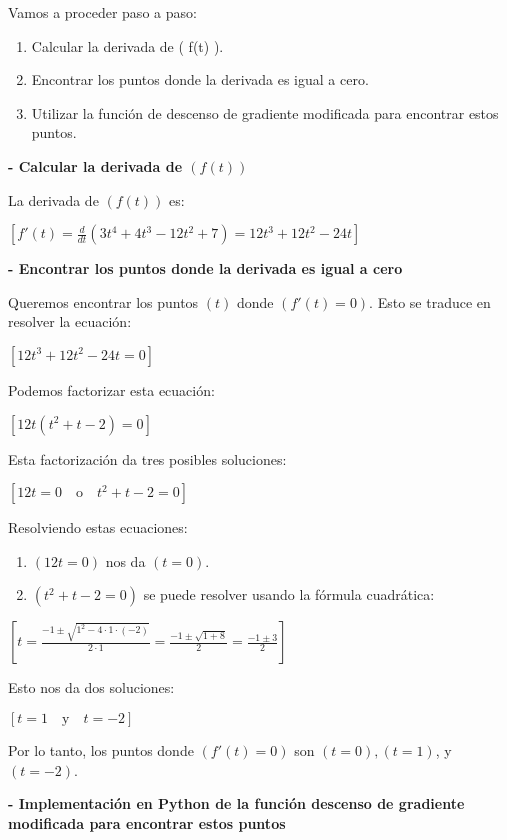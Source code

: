 \documentclass[11pt]{article}
\providecommand{\tightlist}{%
      \setlength{\itemsep}{0pt}\setlength{\parskip}{0pt}}
\begin{document}
Vamos a proceder paso a paso:

\begin{enumerate}
\def\labelenumi{\arabic{enumi}.}
\tightlist
\item
  Calcular la derivada de ( f(t) ).
\item
  Encontrar los puntos donde la derivada es igual a cero.
\item
  Utilizar la función de descenso de gradiente modificada para encontrar
  estos puntos.
\end{enumerate}

\textbf{- Calcular la derivada de \(( f(t) )\)}

La derivada de \(( f(t) )\) es:

\([ f'(t) = \frac{d}{dt}(3t^4 + 4t^3 - 12t^2 + 7) = 12t^3 + 12t^2 - 24t ]\)

    \textbf{- Encontrar los puntos donde la derivada es igual a cero}

Queremos encontrar los puntos \(( t )\) donde \(( f'(t) = 0 )\). Esto se
traduce en resolver la ecuación:

\([ 12t^3 + 12t^2 - 24t = 0 ]\)

Podemos factorizar esta ecuación:

\([ 12t(t^2 + t - 2) = 0 ]\)

Esta factorización da tres posibles soluciones:

\([ 12t = 0 \quad \text{o} \quad t^2 + t - 2 = 0 ]\)

Resolviendo estas ecuaciones:

\begin{enumerate}
\def\labelenumi{\arabic{enumi}.}
\tightlist
\item
  \(( 12t = 0 )\) nos da \(( t = 0 )\).
\item
  \(( t^2 + t - 2 = 0 )\) se puede resolver usando la fórmula
  cuadrática:
\end{enumerate}

\([ t = \frac{-1 \pm \sqrt{1^2 - 4 \cdot 1 \cdot (-2)}}{2 \cdot 1} = \frac{-1 \pm \sqrt{1 + 8}}{2} = \frac{-1 \pm 3}{2} ]\)

Esto nos da dos soluciones:

\([ t = 1 \quad \text{y} \quad t = -2 ]\)

Por lo tanto, los puntos donde \(( f'(t) = 0 )\) son
\(( t = 0 ), ( t = 1 )\), y \(( t = -2 )\).

    \textbf{- Implementación en Python de la función descenso de gradiente
modificada para encontrar estos puntos}
\end{document}
